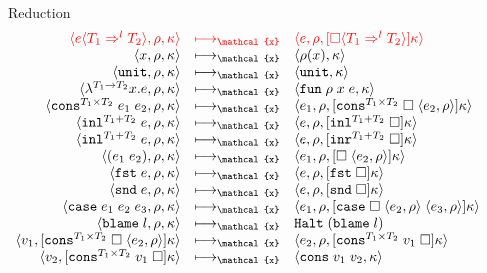 \documentclass[acmsmall,review,anonymous]{acmart}\settopmatter{printfolios=true,printccs=false,printacmref=false}
\newcommand{\plus}[0]{+}
\newcommand{\sOOinspect}[3]{\langle#1,#2,#3\rangle}
\newcommand{\sOOreturn}[2]{\langle#1,#2\rangle}
\newcommand{\sOOhalt}[1]{\mathtt{Halt} \; #1}
\newcommand{\POOprod}[2]{#1 \times #2}
\newcommand{\POOsum}[2]{#1 \plus #2}
\newcommand{\eOOvar}[1]{#1}
\newcommand{\eOOsole}[0]{\mathtt{unit}}
\newcommand{\eOOlam}[4]{\lambda^{#1\rightarrow{}#2}#3.#4}
\newcommand{\eOOapp}[2]{(#1 \; #2)}
\newcommand{\eOOcons}[4]{\mathtt{cons}^{\POOprod{#1}{#2}} \; #3 \; #4}
\newcommand{\eOOcar}[1]{\mathtt{fst} \; #1}
\newcommand{\eOOcdr}[1]{\mathtt{snd} \; #1}
\newcommand{\eOOinl}[3]{\mathtt{inl}^{\POOsum{#1}{#2}} \; #3}
\newcommand{\eOOcase}[3]{\mathtt{case} \; #1 \; #2 \; #3}
\newcommand{\eOOcast}[4]{#1 \langle \cOOcast{#2}{#3}{#4} \rangle}
\newcommand{\eOOblame}[1]{\mathtt{blame} \; #1}
\newcommand{\cOOcast}[3]{#1 \Rightarrow^{#2} #3}
\newcommand{\oOOblame}[1]{\mathtt{blame} \; #1}
\newcommand{\vOOfun}[3]{\mathtt{fun} \; #1 \; #2 \; #3}
\newcommand{\vOOtt}[0]{\mathtt{unit}}
\newcommand{\vOOcons}[2]{\mathtt{cons}\;#1\;#2}
\newcommand{\kOOconsI}[5]{
	[\mathtt{cons}^{\POOprod{#1}{#2}} \; \square \; \langle#3,#4\rangle ]#5}
\newcommand{\kOOconsII}[4]{
	[\mathtt{cons}^{\POOprod{#1}{#2}} \; #3 \; \square]#4}
\newcommand{\kOOinl}[3]{[\mathtt{inl}^{\POOsum{#1}{#2}}\; \square]#3}
\newcommand{\kOOinr}[3]{[\mathtt{inr}^{\POOsum{#1}{#2}}\; \square]#3}
\newcommand{\kOOappI}[3]{
  [\square \; \langle#1,#2\rangle]#3
}
\newcommand{\kOOcar}[1]{[\mathtt{fst} \; \square]#1}
\newcommand{\kOOcdr}[1]{[\mathtt{snd} \; \square]#1}
\newcommand{\kOOcaseI}[4]{
  [\mathtt{case} \; \square \; \langle#1,#3\rangle \; \langle#2,#3\rangle ]#4}
\newcommand{\kOOcast}[2]{
  [\square \langle #1 \rangle]#2}
\newcommand{\judgeCreduce}[2]{#1 \longmapsto_{\mathcal{x}} #2}
\newcommand{\redrule}[3]{#1 & \longmapsto_\mathcal{x} & #2 & #3\\}
\newcommand{\hiredrule}[3]{\highlight{#1} & \highlight{\longmapsto_\mathcal{x}} 
& \highlight{#2} & \highlight{#3} \\}
\newcommand{\highlight}[1]{{\color{red} #1}}
\begin{document}
\begin{figure}
  
  \[
  \begin{array}{rclr}
  \end{array}
  \]
  
  Reduction \fbox{$\judgeCreduce{s}{s}$}
  \[
  \begin{array}{rclr}
    \hiredrule{
    \sOOinspect{\eOOcast{e}{T_1}{l}{T_2}}{\rho}{\kappa}
  }{
    \sOOinspect{e}{\rho}{
      \kOOcast{\cOOcast{T_1}{l}{T_2}}{\kappa}
    }
  }{}
  \redrule{
    \sOOinspect{\eOOvar{x}}{\rho}{\kappa}
  }{  
    \sOOreturn{\rho(x)}{\kappa}
  }{}
  \redrule{
    \sOOinspect{\eOOsole}{\rho}{\kappa}
  }{
    \sOOreturn{\vOOtt}{\kappa}
  }{}
  \redrule{
    \sOOinspect{\eOOlam{T_1}{T_2}{x}{e}}{\rho}{\kappa}
  }{
    \sOOreturn{\vOOfun{\rho}{x}{e}}{\kappa}
  }{}
  \redrule{
    \sOOinspect{\eOOcons{T_1}{T_2}{e_1}{e_2}}{\rho}{\kappa}
  }{
    \sOOinspect{e_1}{\rho}{\kOOconsI{T_1}{T_2}{e_2}{\rho}{\kappa}}
  }{}
  \redrule{
    \sOOinspect{\eOOinl{T_1}{T_2}{e}}{\rho}{\kappa}
  }{
    \sOOinspect{e}{\rho}{\kOOinl{T_1}{T_2}{\kappa}}
  }{}
  \redrule{
  \sOOinspect{\eOOinl{T_1}{T_2}{e}}{\rho}{\kappa}
  }{
  \sOOinspect{e}{\rho}{\kOOinr{T_1}{T_2}{\kappa}}
  }{}
  \redrule{
    \sOOinspect{\eOOapp{e_1}{e_2}}{\rho}{\kappa}
  }{
\sOOinspect{e_1}{\rho}{\kOOappI{e_2}{\rho}{\kappa}}}{}

\redrule{
\sOOinspect{\eOOcar{e}}{\rho}{\kappa}}{
\sOOinspect{e}{\rho}{\kOOcar{\kappa}}}{}

\redrule{
  \sOOinspect{\eOOcdr{e}}{\rho}{\kappa}}{
  \sOOinspect{e}{\rho}{\kOOcdr{\kappa}}}{}

\redrule{
\sOOinspect{\eOOcase{e_1}{e_2}{e_3}}{\rho}{\kappa}}{
\sOOinspect{e_1}{\rho}{\kOOcaseI{e_2}{e_3}{\rho}{\kappa}}}{}

\redrule{
\sOOinspect{\eOOblame{l}}{\rho}{\kappa}}{
\sOOhalt{(\oOOblame{l})}}{}

\redrule{
\sOOreturn{v_1}{\kOOconsI{T_1}{T_2}{e_2}{\rho}{\kappa}}}{
\sOOinspect{e_2}{\rho}{\kOOconsII{T_1}{T_2}{v_1}{\kappa}}}{}

\redrule{
\sOOreturn{v_2}{\kOOconsII{T_1}{T_2}{v_1}{\kappa}}}{
\sOOreturn{\vOOcons{v_1}{v_2}}{\kappa}}{}


\end{array}\]
\end{figure}
\end{document}

